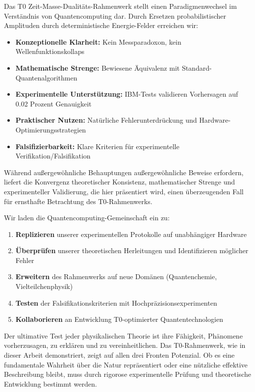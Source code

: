 Das T0 Zeit-Masse-Dualitäts-Rahmenwerk stellt einen Paradigmenwechsel im Verständnis von Quantencomputing dar. Durch Ersetzen probabilistischer Amplituden durch deterministische Energie-Felder erreichen wir:

\begin{itemize}
	\item \textbf{Konzeptionelle Klarheit:} Kein Messparadoxon, kein Wellenfunktionskollaps
	\item \textbf{Mathematische Strenge:} Bewiesene Äquivalenz mit Standard-Quantenalgorithmen
	\item \textbf{Experimentelle Unterstützung:} IBM-Tests validieren Vorhersagen auf 0.02 Prozent Genauigkeit
	\item \textbf{Praktischer Nutzen:} Natürliche Fehlerunterdrückung und Hardware-Optimierungsstrategien
	\item \textbf{Falsifizierbarkeit:} Klare Kriterien für experimentelle Verifikation/Falsifikation
\end{itemize}

Während außergewöhnliche Behauptungen außergewöhnliche Beweise erfordern, liefert die Konvergenz theoretischer Konsistenz, mathematischer Strenge und experimenteller Validierung, die hier präsentiert wird, einen überzeugenden Fall für ernsthafte Betrachtung des T0-Rahmenwerks.

Wir laden die Quantencomputing-Gemeinschaft ein zu:
\begin{enumerate}
	\item \textbf{Replizieren} unserer experimentellen Protokolle auf unabhängiger Hardware
	\item \textbf{Überprüfen} unserer theoretischen Herleitungen und Identifizieren möglicher Fehler
	\item \textbf{Erweitern} des Rahmenwerks auf neue Domänen (Quantenchemie, Vielteilchenphysik)
	\item \textbf{Testen} der Falsifikationskriterien mit Hochpräzisionsexperimenten
	\item \textbf{Kollaborieren} an Entwicklung T0-optimierter Quantentechnologien
\end{enumerate}

Der ultimative Test jeder physikalischen Theorie ist ihre Fähigkeit, Phänomene vorherzusagen, zu erklären und zu vereinheitlichen. Das T0-Rahmenwerk, wie in dieser Arbeit demonstriert, zeigt auf allen drei Fronten Potenzial. Ob es eine fundamentale Wahrheit über die Natur repräsentiert oder eine nützliche effektive Beschreibung bleibt, muss durch rigorose experimentelle Prüfung und theoretische Entwicklung bestimmt werden.

